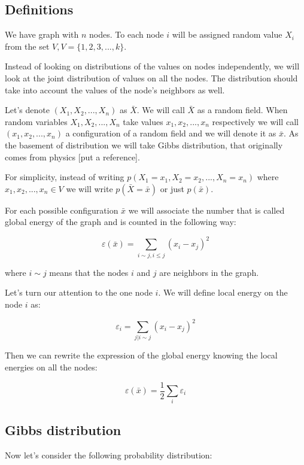 \documentclass[12pt]{report}
\begin{document}
 
 
\subsection{Definitions}

We have graph with $n$ nodes. To each node $i$ will be assigned random value $X_i$ from the set $V, V = \lbrace 1, 2, 3, ..., k \rbrace$. 

Instead of looking on distributions of the values on nodes independently, we will look at the joint distribution of values on all the nodes. The distribution should take into account the values of the node's neighbors as well.

Let's denote $(X_1, X_2, ..., X_n)$ as $\bar{X}$. We will call $\bar{X}$ as a random field. When random variables $X_1, X_2, ..., X_n$ take values $x_1, x_2, ..., x_n$ respectively we will call $(x_1, x_2, ..., x_n)$ a configuration of a random field and we will denote it as $\bar{x}$. As the basement of distribution we will take Gibbs distribution, that originally comes from physics [put a reference].

For simplicity, instead of writing $p(X_1 = x_1, X_2 = x_2, ...,  X_n = x_n)$ where $x_1, x_2, ..., x_n \in V$ we will write $p(\bar{X} = \bar{x})$ or just $p(\bar{x})$.

For each possible configuration $\bar{x}$ we will associate the number that is called global energy of the graph and is counted in the following way:

$$ \varepsilon (\bar{x}) =  \sum\limits_{i \sim j, i \leq j} (x_i - x_j)^2  $$


where $i \sim j$ means that the nodes $i$ and $j$ are neighbors in the graph.

Let's turn our attention to the one node $i$. We will define local energy on the node $i$ as:

$$ \varepsilon_i = \sum\limits_{j | i \sim j}  (x_i - x_j)^2 $$  

Then we can rewrite the expression of the global energy knowing the local energies on all the nodes:

$$ \varepsilon (\bar{x}) = \frac{1}{2}\sum_i \varepsilon_i$$


\subsection{Gibbs distribution}

Now let's consider the following probability distribution:
\end{document}
